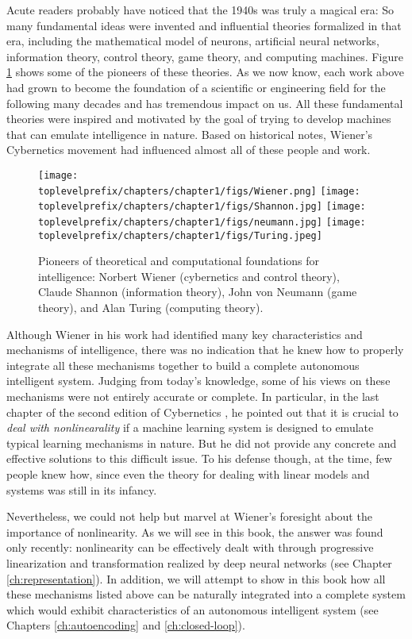 \documentclass[\toplevelprefix/book-main.tex]{subfiles}
\begin{document}
Acute readers probably have noticed that the 1940s was truly a magical era: So many fundamental ideas were invented and influential theories formalized in that era, including the mathematical model of neurons, artificial neural networks, information theory, control theory, game theory, and computing machines. Figure \ref{fig:god-fathers} shows some of the pioneers of these theories. As we now know, each work above had grown to become the foundation of a scientific or engineering field for the following many decades and has tremendous impact on us. All these fundamental theories were inspired and motivated by the goal of trying to develop machines that can emulate intelligence in nature. Based on historical notes, Wiener's Cybernetics movement had influenced almost all of these people and work. 
\begin{figure}
    \centering
    \texttt{[image: \\toplevelprefix/chapters/chapter1/figs/Wiener.png]}
    \texttt{[image: \\toplevelprefix/chapters/chapter1/figs/Shannon.jpg]}
    \texttt{[image: \\toplevelprefix/chapters/chapter1/figs/neumann.jpg]}
    \texttt{[image: \\toplevelprefix/chapters/chapter1/figs/Turing.jpeg]}
    \caption{Pioneers of theoretical and computational foundations for intelligence: Norbert Wiener (cybernetics and control theory), Claude Shannon (information theory), John von Neumann (game theory), and Alan Turing (computing theory).}
    \label{fig:god-fathers}
\end{figure}

Although Wiener in his work had identified many key characteristics and mechanisms of intelligence, there was no indication that he knew how to properly integrate all these mechanisms together to build a complete autonomous intelligent system. Judging from today's knowledge, some of his views on these mechanisms were not entirely accurate or complete. In particular, in the last chapter of the second edition of Cybernetics \cite{Wiener-Cybernetics-1961}, he pointed out that it is crucial to {\em deal with nonlinearality} if a machine learning system is designed to emulate typical learning mechanisms in nature. But he did not provide any concrete and effective solutions to this difficult issue. To his defense though, at the time, few people knew how, since even the theory for dealing with linear models and systems was still in its infancy. 

Nevertheless, we could not help but marvel at Wiener's foresight about the importance of nonlinearity. As we will see in this book, the answer was found only recently: nonlinearity can be effectively dealt with through progressive linearization and transformation realized by deep neural networks (see Chapter \ref{ch:representation}). In addition, we will attempt to show in this book how all these mechanisms listed above can be naturally integrated into a complete system which would exhibit characteristics of an autonomous intelligent system (see Chapters \ref{ch:autoencoding} and \ref{ch:closed-loop}). 
\end{document}
